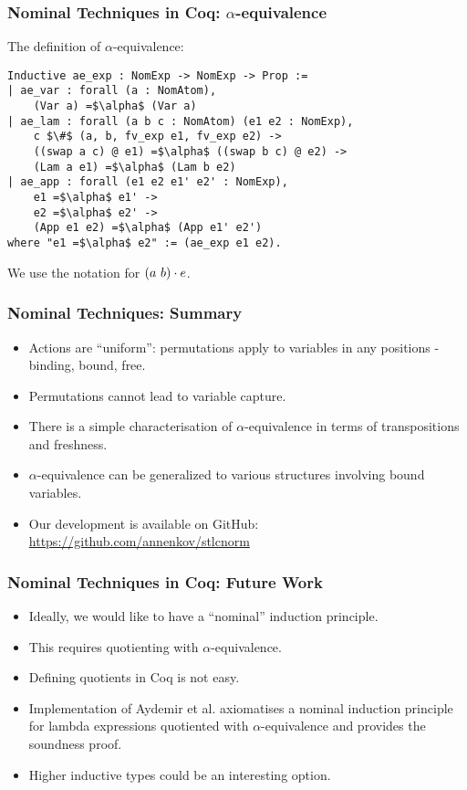 \documentclass[10pt]{beamer}
\begin{document}
\begin{frame}[fragile]
  \frametitle{Nominal Techniques in Coq: $\alpha$-equivalence}
  The definition of $\alpha$-equivalence:
  \begin{lstlisting}
Inductive ae_exp : NomExp -> NomExp -> Prop :=
| ae_var : forall (a : NomAtom),
    (Var a) =$\alpha$ (Var a)
| ae_lam : forall (a b c : NomAtom) (e1 e2 : NomExp),
    c $\#$ (a, b, fv_exp e1, fv_exp e2) ->
    ((swap a c) @ e1) =$\alpha$ ((swap b c) @ e2) ->
    (Lam a e1) =$\alpha$ (Lam b e2)
| ae_app : forall (e1 e2 e1' e2' : NomExp),
    e1 =$\alpha$ e1' ->
    e2 =$\alpha$ e2' ->
    (App e1 e2) =$\alpha$ (App e1' e2')
where "e1 =$\alpha$ e2" := (ae_exp e1 e2).
  \end{lstlisting}

  We use the notation  for $(a ~ b) \cdot e$.
\end{frame}

\begin{frame}
  \frametitle{Nominal Techniques: Summary}
  \begin{itemize}
  \item Actions are ``uniform'': permutations apply to
    variables in any positions - binding, bound, free.
    \pause
  \item Permutations cannot lead to variable capture.
    \pause
  \item There is a simple characterisation of $\alpha$-equivalence in
    terms of transpositions and freshness.
    \pause
  \item $\alpha$-equivalence can be generalized to various structures
    involving bound variables.
    \pause
  \item Our development is available on GitHub:
    \url{https://github.com/annenkov/stlcnorm}
  \end{itemize}
\end{frame}

\begin{frame}
  \frametitle{Nominal Techniques in Coq: Future Work}
  \begin{itemize}
  \item Ideally, we would like to have a ``nominal'' induction principle.
  \item This requires quotienting with $\alpha$-equivalence.
  \item Defining quotients in Coq is not easy.
  \item Implementation of Aydemir et al. axiomatises a nominal
    induction principle for lambda expressions quotiented with
    $\alpha$-equivalence and provides the soundness proof.
  \item Higher inductive types could be an interesting option.
  \end{itemize}
\end{frame}
\end{document}
